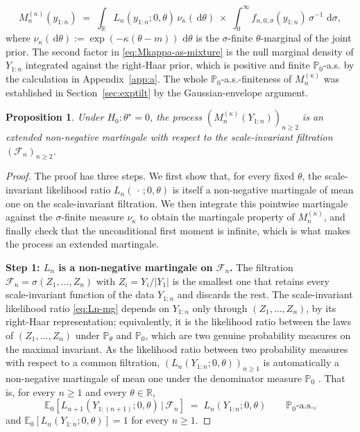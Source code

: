 \documentclass[numsec,webpdf,modern,medium,namedate]{oup-authoring-template}
\theoremstyle{thmstyleone}%
\newtheorem{proposition}[theorem]{Proposition}%
\theoremstyle{thmstyletwo}%
\theoremstyle{thmstylethree}%
\newcommand{\dd}{\,\mathrm{d}}
\newcommand{\1}{\mathbf{1}}
\begin{document}
\begin{appendices}
\begin{equation}\label{eq:Mkappa-as-mixture}
M_n^{(\kappa)}(y_{1:n})
\;=\;\int_\mathbb{R} L_n(y_{1:n};0,\theta)\,\nu_\kappa(\dd\theta)
\;\times\; \int_0^\infty f_{n,0,\sigma}(y_{1:n})\,\sigma^{-1}\,\dd\sigma,
\end{equation}
where \(\nu_\kappa(\dd\theta) := \exp(-\kappa(\theta-m))\,\dd\theta\) is
the \(\sigma\)-finite \(\theta\)-marginal of the joint prior. The
second factor in \eqref{eq:Mkappa-as-mixture} is the null marginal
density of \(Y_{1:n}\) integrated against the right-Haar prior, which is
positive and finite \(\mathbb{P}_0\)-a.s. by the calculation in Appendix~\ref{app:a}. The whole \(\mathbb{P}_0\)-a.s.-finiteness of \(M_n^{(\kappa)}\) was established in Section~\ref{sec:exptilt} by the Gaussian-envelope argument.

\begin{proposition}\label{prop:extended-mg}
Under \(H_0:\theta^\star=0\), the process
\((M_n^{(\kappa)}(Y_{1:n}))_{n\geq 2}\) is an extended non-negative
martingale with respect to the scale-invariant filtration
\((\mathcal{F}_n)_{n\geq 2}\).
\end{proposition}


\begin{proof}
The proof has three steps. We first show that, for every fixed $\theta$,
the scale-invariant likelihood ratio $L_n(\,\cdot\,;0,\theta)$ is itself a
non-negative martingale of mean one on the scale-invariant filtration. We then
integrate this pointwise martingale against the $\sigma$-finite measure
$\nu_\kappa$ to obtain the martingale property of $M_n^{(\kappa)}$, and finally
check that the unconditional first moment is infinite, which is what makes the process an extended martingale.

\textbf{Step 1: $L_n$ is a non-negative martingale on $\mathcal{F}_n$.}
The filtration $\mathcal{F}_n = \sigma(Z_1,\dots,Z_n)$ with $Z_i = Y_i/|Y_1|$ is the smallest one that retains every scale-invariant function of the data
$Y_{1:n}$ and discards the rest. The scale-invariant likelihood ratio
\eqref{eq:Ln-mg} depends on $Y_{1:n}$ only through $(Z_1,\dots,Z_n)$, by its
right-Haar representation; equivalently, it is the likelihood ratio between
the laws of $(Z_1,\dots,Z_n)$ under $\mathbb{P}_\theta$ and $\mathbb{P}_0$,
which are two genuine probability measures on the maximal invariant. As the
likelihood ratio between two probability measures with respect to a common
filtration, $(L_n(Y_{1:n};0,\theta))_{n\geq 1}$ is automatically a non-negative
martingale of mean one under the denominator measure $\mathbb{P}_0$
\citep[Cor.~4.6]{Wang2025}. That is, for every $n\geq 1$ and every
$\theta\in\mathbb{R}$,
\begin{equation}\label{eq:Ln-mg}
   \mathbb{E}_0\!\left[L_{n+1}(Y_{1:(n+1)};0,\theta)\,\big|\,\mathcal{F}_n\right]
   \;=\; L_n(Y_{1:n};0,\theta)
   \qquad\mathbb{P}_0\text{-a.s.,}
\end{equation}
and $\mathbb{E}_0[L_n(Y_{1:n};0,\theta)] = 1$ for every $n\geq 1$.


\end{proof}
\end{appendices}
\end{document}
